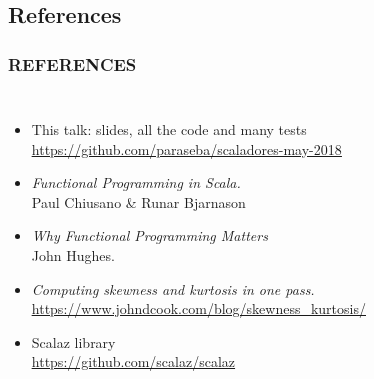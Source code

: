 \documentclass{beamer}
\begin{document}
\subsection*{References}
\begin{frame} \frametitle{REFERENCES}
  \begin{columns}[c]
      \begin{itemize}

        \item This talk: slides, all the \alert{code and many tests} \\
          \href{https://github.com/paraseba/scaladores-may-2018}{\underline{https://github.com/paraseba/scaladores-may-2018}} %

        \item \textit{Functional Programming in Scala.}\\ Paul Chiusano \& Runar Bjarnason

        \item \textit{Why Functional Programming Matters} \\
          John Hughes.

        \item \textit{Computing skewness and kurtosis in one pass.} \\
          {\footnotesize \href{https://www.johndcook.com/blog/skewness\_kurtosis/}{\underline{https://www.johndcook.com/blog/skewness\_kurtosis/}}}

        \item Scalaz library \\
          {\href{https://github.com/scalaz/scalaz}{\underline{https://github.com/scalaz/scalaz}}}
      \end{itemize}



\end{columns}
\end{frame}
\end{document}
